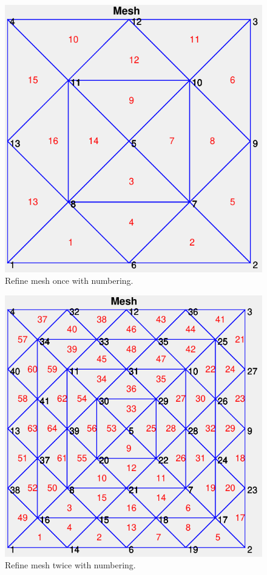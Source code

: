 \documentclass[11pt,a4paper,center,notitlepage]{article}
\numberwithin{equation}{section}
\begin{document}
\begin{figure}[H]
\centering
\includegraphics[scale=0.9]{6}
\caption{Refine mesh once with numbering.}
\end{figure}

\begin{figure}[H]
\centering
\includegraphics[scale=0.9]{7}
\caption{Refine mesh twice with numbering.}
\end{figure}
\end{document}
